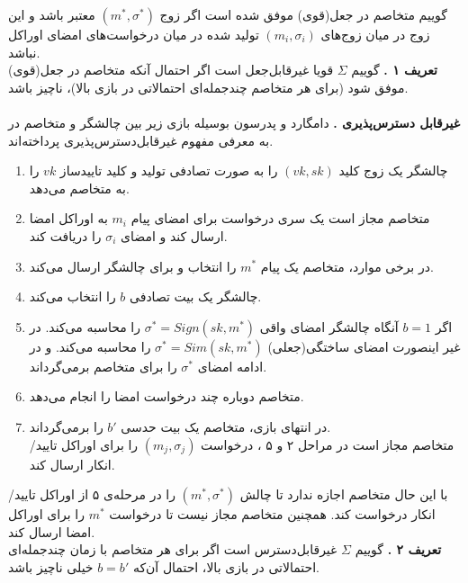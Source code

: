 \documentclass[12pt,a4paper]{article}
\begin{document}
گوییم متخاصم در جعل(قوی) موفق شده است اگر زوج
$(m^*,\sigma^*)$
معتبر باشد و این زوج در میان زوج‌های 
$(m_i,\sigma_i)$
تولید شده در میان درخواست‌های امضای اوراکل نباشد.
\\
\textbf{تعریف ۱ .}
گوییم 
$\Sigma$
قویا غیرقابل‌جعل است اگر احتمال آنکه متخاصم در جعل(قوی) موفق شود (برای هر متخاصم چندجمله‌ای احتمالاتی در بازی بالا)، ناچیز باشد.
\\
\\
\textbf{غیرقابل دسترس‌پذیری . }
دامگارد و پدرسون بوسیله بازی زیر بین چالشگر و متخاصم در 
\cite{convertibleـundeniable}
به معرفی مفهوم غیرقابل‌دسترس‌پذیری پرداخته‌اند.
\begin{enumerate}
	
	\item 
	چالشگر یک زوج کلید
	$(vk,sk)$
	را به صورت تصادفی تولید و کلید تاییدساز 
	$vk$
	را به متخاصم می‌دهد.
	\item 
	متخاصم مجاز است یک سری درخواست برای امضای پیام
	$m_i$
	به اوراکل امضا ارسال کند و امضای
	$\sigma_i$
	را دریافت کند.
	\item 
	در برخی موارد، متخاصم یک پیام 
	$m^*$
	را انتخاب و برای چالشگر ارسال می‌کند.
	\item 
	چالشگر یک بیت تصادفی 
	$b$
	را انتخاب می‌کند.
	\item 
	اگر 
	$b = 1$
	آنگاه چالشگر امضای واقی
	$\sigma^* = Sign(sk,m^*)$
	را محاسبه می‌کند. در غیر اینصورت امضای ساختگی(جعلی) 
	$\sigma^* = Sim(sk,m^*)$
	را محاسبه می‌کند. و در ادامه امضای
	$\sigma^*$
	را برای متخاصم برمی‌گرداند.
	\item 
	متخاصم دوباره چند درخواست امضا را انجام می‌دهد.
	\item 
	در انتهای بازی، متخاصم یک بیت حدسی 
	$b'$
	را برمی‌گرداند.
	\\
	متخاصم مجاز است در مراحل ۲ و ۵ ، درخواست 
	$(m_j,\sigma_j)$
	را برای اوراکل تایید/انکار ارسال کند.
\end{enumerate}

با این حال متخاصم اجازه ندارد تا چالش 
$(m^*,\sigma^*)$
را در مرحله‌ی ۵ از اوراکل تایید/انکار درخواست کند. همچنین متخاصم مجاز نیست تا درخواست
$m^*$
را برای اوراکل امضا ارسال کند.
\\
\textbf{تعریف ۲ .}
گوییم
$\Sigma$
غیرقابل‌دسترس است اگر برای هر متخاصم با زمان چندجمله‌ای احتمالاتی در بازی بالا،‌  احتمال آن‌که 
$b = b'$
خیلی ناچیز باشد.
\end{document}
